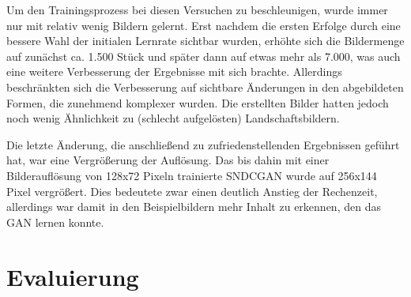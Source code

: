  Um den Trainingsprozess bei diesen Versuchen zu beschleunigen, wurde immer nur mit relativ wenig Bildern gelernt. Erst nachdem die ersten Erfolge durch eine bessere Wahl der initialen Lernrate sichtbar wurden, erhöhte sich die Bildermenge auf zunächst ca. 1.500 Stück und später dann auf etwas mehr als 7.000, was auch eine weitere Verbesserung der Ergebnisse mit sich brachte. Allerdings beschränkten sich die Verbesserung auf sichtbare Änderungen in den abgebildeten Formen, die zunehmend komplexer wurden. Die erstellten Bilder hatten jedoch noch wenig Ähnlichkeit zu (schlecht aufgelösten) Landschaftsbildern.
 
 Die letzte Änderung, die anschließend zu zufriedenstellenden Ergebnissen geführt hat, war eine Vergrößerung der Auflösung. Das bis dahin mit einer Bilderauflösung von 128x72 Pixeln trainierte SNDCGAN wurde auf 256x144 Pixel vergrößert. Dies bedeutete zwar einen deutlich Anstieg der Rechenzeit, allerdings war damit in den Beispielbildern mehr Inhalt zu erkennen, den das GAN lernen konnte.
 
 \section{Evaluierung}\label{evalGen} %